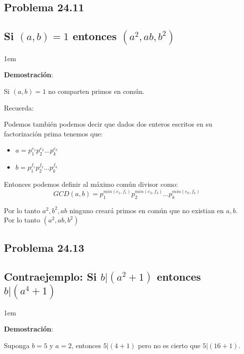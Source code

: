 \documentclass[12pt, fleqn]{article}                             %
\newenvironment{SmallIndentation}[1][0.75em]                    %
    {\begin{adjustwidth}{#1}{}\begin{footnotesize}}                 %
    {\end{footnotesize}\end{adjustwidth}}                           %
\begin{document}
    \subsection{Problema 24.11}
    \subsection*{Si $(a,b)=1$ entonces $(a^2, ab, b^2)$}

    \begin{SmallIndentation}[1em]
        \textbf{Demostración}:
        
        Si $(a,b)=1$ no comparten primos en común.

        Recuerda:

        Podemos también podemos decir que dados dos enteros escritos en 
        su factorización prima tenemos que:
        \begin{itemize}
            \item $a = p_1^{e_1} p_2^{e_2} \dots p_k^{e_k}$
            \item $b = p_1^{f_1} p_2^{f_2} \dots p_k^{f_k}$
        \end{itemize}

        Entonces podemos definir al máximo común divisor como:
        \begin{equation}
            GCD(a, b) = p_1^{min(e_1, f_1)} p_2^{min(e_2, f_2)} \dots p_k^{min(e_k, f_k)}
        \end{equation}

        Por lo tanto $a^2, b^2, ab$ ninguno creará primos en común
        que no existian en $a, b$. Por lo tanto $(a^2, ab, b^2)$

    \end{SmallIndentation}

    \subsection{Problema 24.13}
    \subsection*{Contraejemplo: Si $b|(a^2+1)$ entonces $b|(a^4+1)$}

    \begin{SmallIndentation}[1em]
        \textbf{Demostración}:
        
        Suponga $b=5$ y $a=2$, entonces $5|(4+1)$ pero no es cierto que
        $5|(16+1)$.
    \end{SmallIndentation}
\end{document}
